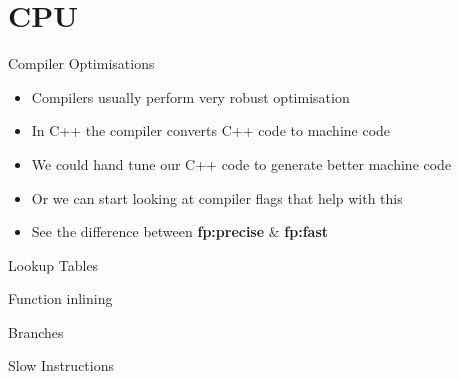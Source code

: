 \part{CPU}
\frame{\partpage}

\begin{frame}{Compiler Optimisations}
	\begin{itemize}
		\pause \item Compilers usually perform very robust optimisation
		\pause \item In C++ the compiler converts C++ code to machine code
		\pause \item We could hand tune our C++ code to generate better machine code
		\pause \item Or we can start looking at compiler flags that help with this
		\pause \item See the difference between \textbf{fp:precise} \& \textbf{fp:fast}  
	\end{itemize}
\end{frame}

\begin{frame}{Lookup Tables}
\end{frame}

\begin{frame}{Function inlining}
\end{frame}

\begin{frame}{Branches}
\end{frame}

\begin{frame}{Slow Instructions}
\end{frame}

